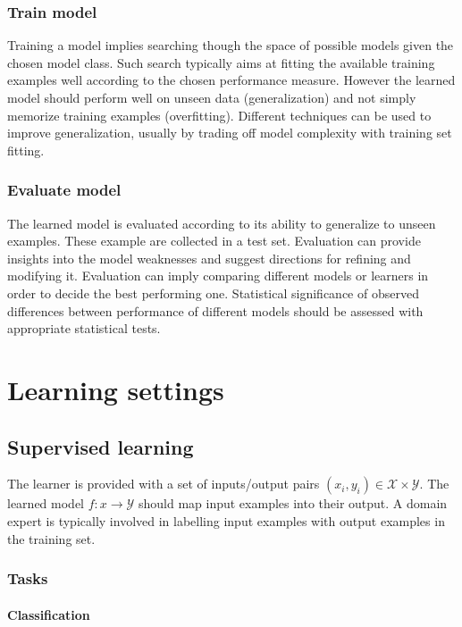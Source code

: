 		\subsubsection{Train model}
		Training a model implies searching though the space of possible models given the chosen model class.
		Such search typically aims at fitting the available training examples well according to the chosen performance measure.
		However the learned model should perform well on unseen data (generalization) and not simply memorize training examples (overfitting).
		Different techniques can be used to improve generalization, usually by trading off model complexity with training set fitting.

		\subsubsection{Evaluate model}
		The learned model is evaluated according to its ability to generalize to unseen examples.
		These example are collected in a test set.
		Evaluation can provide insights into the model weaknesses and suggest directions for refining and modifying it.
		Evaluation can imply comparing different models or learners in order to decide the best performing one.
		Statistical significance of observed differences between performance of different models should be assessed with appropriate statistical tests.


\section{Learning settings}

	\subsection{Supervised learning}
	The learner is provided with a set of inputs/output pairs $(x_i,y_i)\in \mathcal{X}\times \mathcal{Y}$.
	The learned model $f:x\rightarrow \mathcal{Y}$ should map input examples into their output.
	A domain expert is typically involved in labelling input examples with output examples in the training set.

		\subsubsection{Tasks}

			\paragraph{Classification}

